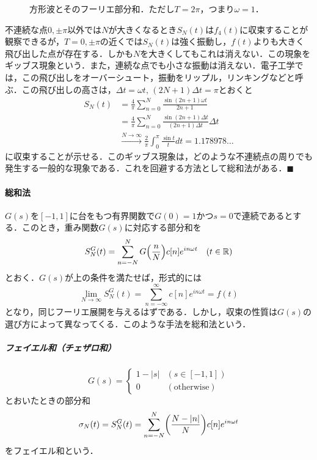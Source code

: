 \documentclass[dvipdfmx,a4j,10pt]{jsarticle}
\theoremstyle{mystyle1}
\theoremstyle{mystyle3}
\theoremstyle{mystyle4}
\theoremstyle{mystyle6}
\theoremstyle{mystyle2}
\theoremstyle{mystyle5}
\renewcommand{\qedsymbol}{\hfill\ensuremath{\blacksquare}}
\begin{document}
\begin{figure}
	\begin{center}
		
	\end{center}
	\caption{方形波とそのフーリエ部分和．ただし$T=2\pi$，つまり$\omega=1$．}
	\label{fig:ex1-4}
\end{figure}

不連続な点$0,\pm\pi$以外では$N$が大きくなるとき$S_N(t)$は$f_4(t)$に収束することが観察できるが，$T=0,\pm\pi$の近くでは$S_N(t)$は強く振動し，$f(t)$よりも大きく飛び出した点が存在する．しかも$N$を大きくしてもこれは消えない．この現象をギッブス現象という．また，連続な点でも小さな振動は消えない．電子工学では，この飛び出しをオーバーシュート，振動をリップル，リンキングなどと呼ぶ．この飛び出しの高さは，$\Delta t=\omega t,\, (2N+1)\Delta t=\pi$とおくと
\[
	\begin{split}
		S_N(t)
		&=\frac{4}{\pi}\sum_{n=0}^N \frac{\sin(2n+1)\omega t}{2n+1} \\
		&=\frac{4}{\pi}\sum_{n=0}^N \frac{\sin(2n+1)\Delta t}{(2n+1)\Delta t}\Delta t \\
		&\overset{N\to\infty}{\longrightarrow}\frac{2}{\pi}\int_0^\pi \frac{\sin t}{t}dt=1.178978\ldots
	\end{split}
\]
に収束することが示せる．このギッブス現象は，どのような不連続点の周りでも発生する一般的な現象である．これを回避する方法として総和法がある．\qedsymbol

\paragraph{総和法}

$G(s)$を$[-1,1]$に台をもつ有界関数で$G(0)=1$かつ$s=0$で連続であるとする．このとき，重み関数$G(s)$に対応する部分和を
\[
	S_N^G(t)=\sum_{n=-N}^N G\mleft(\frac{n}{N}\mright)c[n]e^{in\omega t}\quad(t\in\mathbb{R})
\]
とおく．$G(s)$が上の条件を満たせば，形式的には
\[
	\lim_{N\to\infty} S_N^G(t)=\sum_{n=-\infty}^\infty c[n]e^{in\omega t}=f(t)
\]
となり，同じフーリエ展開を与えるはずである．しかし，収束の性質は$G(s)$の選び方によって異なってくる．このような手法を総和法という．

\subparagraph{フェイエル和（チェザロ和）}
\[
	G(s)=\begin{cases}
		1-|s| & (s\in[-1,1])         \\
		0     & (\textrm{otherwise})
	\end{cases}
\]
とおいたときの部分和
\[
	\sigma_N(t)=S_N^G(t)=\sum_{n=-N}^N\mleft(\frac{N-|n|}{N}\mright)c[n]e^{in\omega t}
\]
をフェイエル和という．
\end{document}
